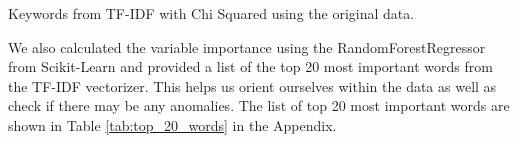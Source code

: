 \begin{table}[!ht]
\centering
\caption{Keywords from TF-IDF with Chi Squared using the original data.}

\label{tab:correlated_unigrams_original}
\end{table}


We also calculated the variable importance using the RandomForestRegressor from Scikit-Learn and provided a list of the top 20 most important words from the TF-IDF vectorizer. This helps us orient ourselves within the data as well as check if there may be any anomalies. The list of top 20 most important words are shown in Table \ref{tab:top_20_words} in the Appendix.



